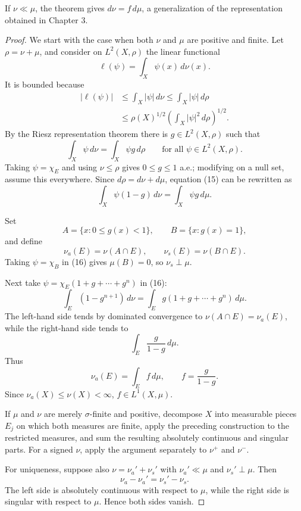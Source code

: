 \documentclass[11pt,openany]{book}
\begin{document}
If $\nu\ll\mu$, the theorem gives $d\nu=f\,d\mu$, a generalization of the representation obtained in Chapter 3.

\begin{proof}
We start with the case when both $\nu$ and $\mu$ are positive and finite. Let $\rho=\nu+\mu$, and consider on $L^2(X,\rho)$ the linear functional
\[
\ell(\psi)=\int_X\psi(x)\,d\nu(x).
\]
It is bounded because
\begin{align*}
|\ell(\psi)|
&\leq\int_X|\psi|\,d\nu
\leq\int_X|\psi|\,d\rho\\
&\leq\rho(X)^{1/2}\left(\int_X|\psi|^2\,d\rho\right)^{1/2}.
\end{align*}
By the Riesz representation theorem there is $g\in L^2(X,\rho)$ such that
\begin{equation}
\int_X\psi\,d\nu=\int_X\psi g\,d\rho
\qquad\text{for all }\psi\in L^2(X,\rho).
\tag{15}
\end{equation}
Taking $\psi=\chi_E$ and using $\nu\leq\rho$ gives $0\leq g\leq1$ a.e.; modifying on a null set, assume this everywhere. Since $d\rho=d\nu+d\mu$, equation (15) can be rewritten as
\begin{equation}
\int_X\psi(1-g)\,d\nu=\int_X\psi g\,d\mu.
\tag{16}
\end{equation}

Set
\[
A=\{x:0\leq g(x)<1\},
\qquad
B=\{x:g(x)=1\},
\]
and define
\[
\nu_a(E)=\nu(A\cap E),
\qquad
\nu_s(E)=\nu(B\cap E).
\]
Taking $\psi=\chi_B$ in (16) gives $\mu(B)=0$, so $\nu_s\perp\mu$.

Next take $\psi=\chi_E(1+g+\cdots+g^n)$ in (16):
\begin{equation}
\int_E(1-g^{n+1})\,d\nu
=\int_E g(1+g+\cdots+g^n)\,d\mu.
\tag{17}
\end{equation}
The left-hand side tends by dominated convergence to $\nu(A\cap E)=\nu_a(E)$, while the right-hand side tends to
\[
\int_E\frac{g}{1-g}\,d\mu.
\]
Thus
\[
\nu_a(E)=\int_E f\,d\mu,
\qquad
f=\frac{g}{1-g}.
\]
Since $\nu_a(X)\leq\nu(X)<\infty$, $f\in L^1(X,\mu)$.

If $\mu$ and $\nu$ are merely $\sigma$-finite and positive, decompose $X$ into measurable pieces $E_j$ on which both measures are finite, apply the preceding construction to the restricted measures, and sum the resulting absolutely continuous and singular parts. For a signed $\nu$, apply the argument separately to $\nu^+$ and $\nu^-$.

For uniqueness, suppose also $\nu=\nu_a'+\nu_s'$ with $\nu_a'\ll\mu$ and $\nu_s'\perp\mu$. Then
\[
\nu_a-\nu_a'=\nu_s'-\nu_s.
\]
The left side is absolutely continuous with respect to $\mu$, while the right side is singular with respect to $\mu$. Hence both sides vanish.
\end{proof}
\end{document}
